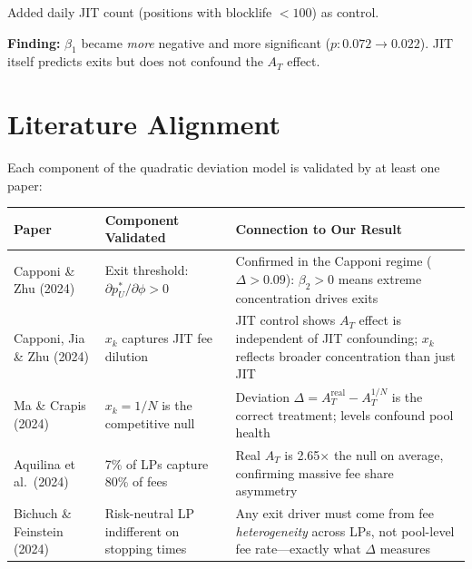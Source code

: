 \documentclass[11pt,a4paper]{article}
\begin{document}
Added daily JIT count (positions with blocklife $< 100$) as control.

\textbf{Finding:} $\beta_1$ became \emph{more} negative and more significant
($p: 0.072 \to 0.022$). JIT itself predicts exits but does not confound the
$A_T$ effect.


\section{Literature Alignment}\label{sec:literature}

Each component of the quadratic deviation model is validated by at least one
paper:

\begin{longtable}{p{3.5cm} p{4cm} p{5cm}}
\toprule
Paper & Component Validated & Connection to Our Result \\
\midrule
\endhead

Capponi \& Zhu (2024) &
  Exit threshold: $\partial p_U^* / \partial \phi > 0$ &
  Confirmed in the Capponi regime ($\Delta > 0.09$): $\beta_2 > 0$ means
  extreme concentration drives exits \\[6pt]

Capponi, Jia \& Zhu (2024) &
  $x_k$ captures JIT fee dilution &
  JIT control shows $A_T$ effect is independent of JIT confounding; $x_k$
  reflects broader concentration than just JIT \\[6pt]

Ma \& Crapis (2024) &
  $x_k = 1/N$ is the competitive null &
  Deviation $\Delta = A_T^{\text{real}} - A_T^{1/N}$ is the correct
  treatment; levels confound pool health \\[6pt]

Aquilina et al.\ (2024) &
  7\% of LPs capture 80\% of fees &
  Real $A_T$ is 2.65$\times$ the null on average, confirming massive fee
  share asymmetry \\[6pt]

Bichuch \& Feinstein (2024) &
  Risk-neutral LP indifferent on stopping times &
  Any exit driver must come from fee \emph{heterogeneity} across LPs, not
  pool-level fee rate---exactly what $\Delta$ measures \\

\bottomrule
\end{longtable}


\end{document}
